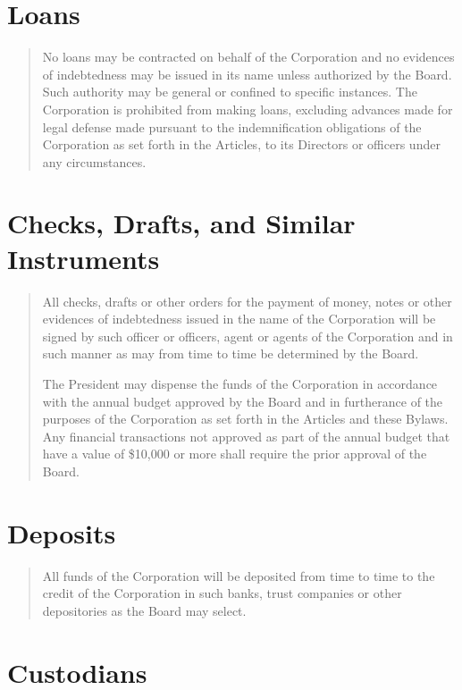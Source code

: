 \documentclass[
]{book}
\begin{document}
\section{Loans}\label{loans}

\begin{quote}
No loans may be contracted on behalf of the Corporation and no
evidences of indebtedness may be issued in its name unless authorized
by the Board. Such authority may be general or confined to specific
instances. The Corporation is prohibited from making loans, excluding
advances made for legal defense made pursuant to the indemnification
obligations of the Corporation as set forth in the Articles, to its
Directors or officers under any circumstances.
\end{quote}

\section{Checks, Drafts, and Similar Instruments}\label{checks-drafts-and-similar-instruments}

\begin{quote}
All checks, drafts or other orders for the payment of money, notes or
other evidences of indebtedness issued in the name of the Corporation
will be signed by such officer or officers, agent or agents of the
Corporation and in such manner as may from time to time be determined
by the Board.

The President may dispense the funds of the Corporation in accordance
with the annual budget approved by the Board and in furtherance of the
purposes of the Corporation as set forth in the Articles and these
Bylaws. Any financial transactions not approved as part of the annual
budget that have a value of \$10,000 or more shall require the prior
approval of the Board.
\end{quote}

\section{Deposits}\label{deposits}

\begin{quote}
All funds of the Corporation will be deposited from time to time to
the credit of the Corporation in such banks, trust companies or other
depositories as the Board may select.
\end{quote}

\section{Custodians}\label{custodians}
\end{document}
